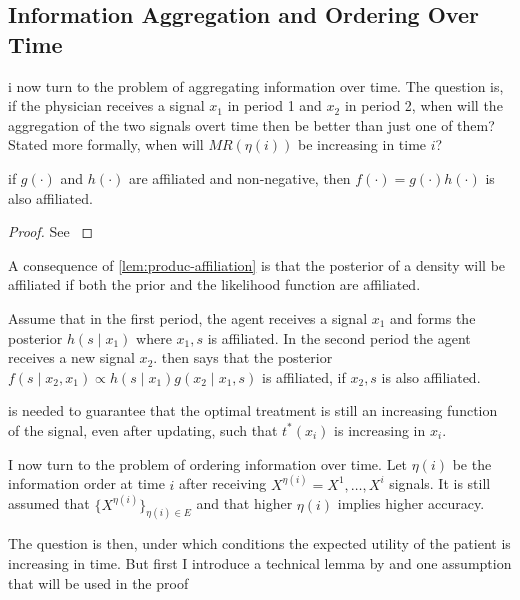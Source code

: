\documentclass[11pt,a4paper,twoside]{article}
\begin{document}
\subsection{Information Aggregation and Ordering Over Time}
i now turn to the problem of aggregating information over time. The question is, if the physician receives a signal \(x_1\) in period 1 and \(x_2\) in period 2, when will the aggregation of the two signals overt time then be better than just one of them? Stated more formally, when will \(MR(\eta(i))\) be increasing in time \(i\)?

\begin{lemma}\label{lem:produc-affiliation}
	if \(g(\cdot)\) and \(h(\cdot)\) are affiliated and non-negative, then \(f(\cdot)=g(\cdot)h(\cdot)\) is also affiliated.
\end{lemma}
\begin{proof}
	See \textcite{Milgrom1982a}
\end{proof}
A consequence of \cref{lem:produc-affiliation} is that the posterior of a density will be affiliated if both the prior and the likelihood function are affiliated.

\begin{example}
 Assume that in the first period, the agent receives a signal \(x_1\) and forms the posterior \(h(s\mid x_1)\) where \(x_1,s\) is affiliated. In the second period the agent receives a new signal \(x_2\).  then says that the posterior \(f(s\mid x_2,x_1) \propto h(s\mid x_1)g(x_2\mid x_1,s)\) is affiliated, if \(x_2,s\) is also affiliated.
 \end{example}

 is needed to guarantee that the optimal treatment is still an increasing function of the signal, even after updating, such that \(t^*(x_i)\) is increasing in \(x_i\).

I now turn to the problem of ordering information over time. Let \(\eta(i)\) be the information order at time \(i\) after receiving \({X}^{\eta(i)}=X^{1},\ldots,X^{i}\) signals. It is still assumed that \(\{{X}^{\eta(i)}\}_{\eta(i)\in E}\) and that higher \(\eta(i)\) implies higher accuracy.

The question is then, under which conditions the expected utility of the patient is increasing in time. But first I introduce a technical lemma by \textcite{Persico1996} and one assumption that will be used in the proof
\end{document}
